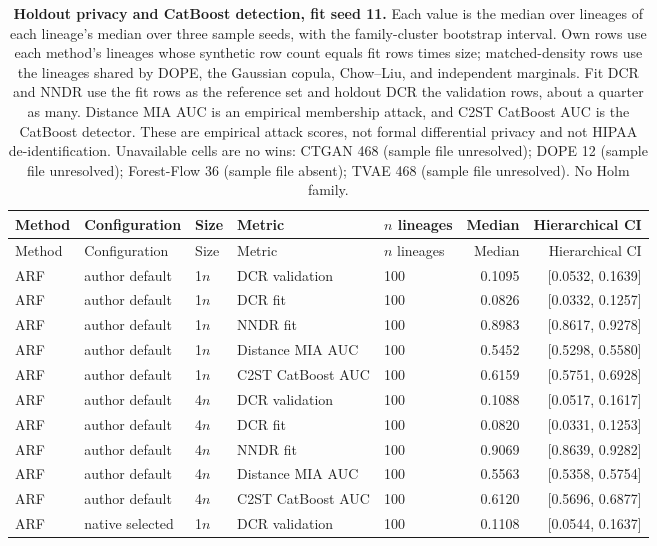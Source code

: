 \begin{longtable}{lllllrr}
\caption{\textbf{Holdout privacy and CatBoost detection, fit seed 11.} Each value is the median over lineages of each lineage's median over three sample seeds, with the family-cluster bootstrap interval. Own rows use each method's lineages whose synthetic row count equals fit rows times size; matched-density rows use the lineages shared by DOPE, the Gaussian copula, Chow--Liu, and independent marginals. Fit DCR and NNDR use the fit rows as the reference set and holdout DCR the validation rows, about a quarter as many. Distance MIA AUC is an empirical membership attack, and C2ST CatBoost AUC is the CatBoost detector. These are empirical attack scores, not formal differential privacy and not HIPAA de-identification. Unavailable cells are no wins: CTGAN 468 (sample file unresolved); DOPE 12 (sample file unresolved); Forest-Flow 36 (sample file absent); TVAE 468 (sample file unresolved). No Holm family.}\label{tab:review-privacy}\\
\toprule
Method & Configuration & Size & Metric & $n$ lineages & Median & Hierarchical CI \\
\midrule
\endfirsthead
\toprule
Method & Configuration & Size & Metric & $n$ lineages & Median & Hierarchical CI \\
\midrule
\endhead
ARF & author default & 1$n$ & DCR validation & 100 & 0.1095 & [0.0532, 0.1639] \\
ARF & author default & 1$n$ & DCR fit & 100 & 0.0826 & [0.0332, 0.1257] \\
ARF & author default & 1$n$ & NNDR fit & 100 & 0.8983 & [0.8617, 0.9278] \\
ARF & author default & 1$n$ & Distance MIA AUC & 100 & 0.5452 & [0.5298, 0.5580] \\
ARF & author default & 1$n$ & C2ST CatBoost AUC & 100 & 0.6159 & [0.5751, 0.6928] \\
ARF & author default & 4$n$ & DCR validation & 100 & 0.1088 & [0.0517, 0.1617] \\
ARF & author default & 4$n$ & DCR fit & 100 & 0.0820 & [0.0331, 0.1253] \\
ARF & author default & 4$n$ & NNDR fit & 100 & 0.9069 & [0.8639, 0.9282] \\
ARF & author default & 4$n$ & Distance MIA AUC & 100 & 0.5563 & [0.5358, 0.5754] \\
ARF & author default & 4$n$ & C2ST CatBoost AUC & 100 & 0.6120 & [0.5696, 0.6877] \\
ARF & native selected & 1$n$ & DCR validation & 100 & 0.1108 & [0.0544, 0.1637] \\

\end{longtable}
